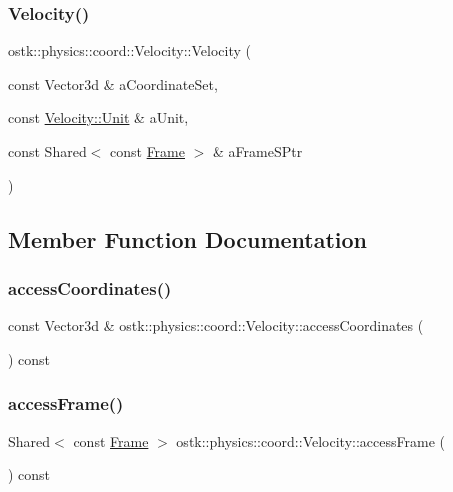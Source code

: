 \subsubsection{\texorpdfstring{Velocity()}{Velocity()}}
{\footnotesize\ttfamily ostk\+::physics\+::coord\+::\+Velocity\+::\+Velocity (\begin{DoxyParamCaption}\item[{const Vector3d \&}]{a\+Coordinate\+Set,  }\item[{const \hyperlink{classostk_1_1physics_1_1coord_1_1_velocity_a01701e56094328a31d0211da5ac1ba28}{Velocity\+::\+Unit} \&}]{a\+Unit,  }\item[{const Shared$<$ const \hyperlink{classostk_1_1physics_1_1coord_1_1_frame}{Frame} $>$ \&}]{a\+Frame\+S\+Ptr }\end{DoxyParamCaption})}



\subsection{Member Function Documentation}
\mbox{\label{classostk_1_1physics_1_1coord_1_1_velocity_a2c567b0c5a5d2036e5ba8a043ddda598}} 
\subsubsection{\texorpdfstring{access\+Coordinates()}{accessCoordinates()}}
{\footnotesize\ttfamily const Vector3d \& ostk\+::physics\+::coord\+::\+Velocity\+::access\+Coordinates (\begin{DoxyParamCaption}{ }\end{DoxyParamCaption}) const}

\mbox{\label{classostk_1_1physics_1_1coord_1_1_velocity_aa2f7454c6f34503989d6adf2e5d581f6}} 
\subsubsection{\texorpdfstring{access\+Frame()}{accessFrame()}}
{\footnotesize\ttfamily Shared$<$ const \hyperlink{classostk_1_1physics_1_1coord_1_1_frame}{Frame} $>$ ostk\+::physics\+::coord\+::\+Velocity\+::access\+Frame (\begin{DoxyParamCaption}{ }\end{DoxyParamCaption}) const}

